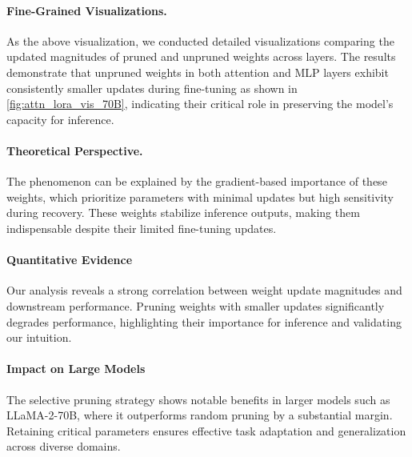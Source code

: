 \paragraph{Fine-Grained Visualizations.} 
As the above visualization, we conducted detailed visualizations comparing the updated magnitudes of pruned and unpruned weights across layers. The results demonstrate that unpruned weights in both attention and MLP layers exhibit consistently smaller updates during fine-tuning as shown in \cref{fig:attn_lora_vis_70B}, indicating their critical role in preserving the model's capacity for inference.{\paragraph{Theoretical Perspective.} The phenomenon can be explained by the gradient-based importance of these weights, which prioritize parameters with minimal updates but high sensitivity during recovery. These weights stabilize inference outputs, making them indispensable despite their limited fine-tuning updates.}

{\paragraph{Quantitative Evidence} Our analysis reveals a strong correlation between weight update magnitudes and downstream performance. Pruning weights with smaller updates significantly degrades performance, highlighting their importance for inference and validating our intuition.}
{\paragraph{Impact on Large Models} The selective pruning strategy shows notable benefits in larger models such as LLaMA-2-70B, where it outperforms random pruning by a substantial margin. Retaining critical parameters ensures effective task adaptation and generalization across diverse domains.}


\clearpage
